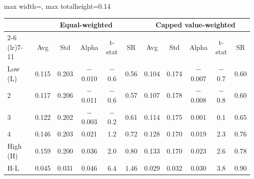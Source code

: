 \begin{table}[htbp]
{\begin{adjustbox}{max width=\linewidth, max totalheight=0.14\textheight}
\begin{tabular}{lcccccccccc}
\toprule
 & \multicolumn{5}{c}{Equal-weighted} & \multicolumn{5}{c}{Capped value-weighted} \\
\cmidrule(lr){2-6} \cmidrule(lr){7-11}
 & Avg & Std & Alpha & t-stat & SR & Avg & Std & Alpha & t-stat & SR \\
\midrule
Low (L) & 0.115 & 0.203 & $-$0.010 & $-$0.6 & 0.56 & 0.104 & 0.174 & $-$0.007 & $-$0.7 & 0.60 \\
2 & 0.117 & 0.206 & $-$0.011 & $-$0.6 & 0.57 & 0.107 & 0.178 & $-$0.008 & $-$0.8 & 0.60 \\
3 & 0.122 & 0.202 & $-$0.003 & $-$0.2 & 0.61 & 0.114 & 0.175 & \phantom{$-$}0.001 & \phantom{$-$}0.1 & 0.65 \\
4 & 0.146 & 0.203 & \phantom{$-$}0.021 & \phantom{$-$}1.2 & 0.72 & 0.128 & 0.170 & \phantom{$-$}0.019 & \phantom{$-$}2.3 & 0.76 \\
High (H) & 0.159 & 0.200 & \phantom{$-$}0.036 & \phantom{$-$}2.0 & 0.80 & 0.133 & 0.170 & \phantom{$-$}0.023 & \phantom{$-$}2.6 & 0.78 \\
H-L & 0.045 & 0.031 & \phantom{$-$}0.046 & \phantom{$-$}6.4 & 1.46 & 0.029 & 0.032 & \phantom{$-$}0.030 & \phantom{$-$}3.8 & 0.90 \\
\bottomrule
\end{tabular}
\end{adjustbox}
}
\end{table}
